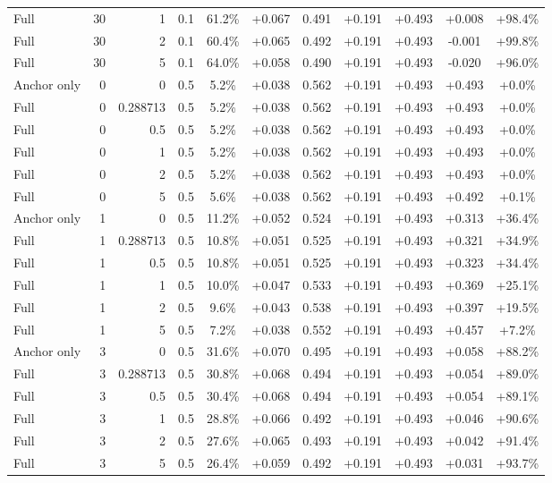 \begin{table}[htbp]
\begin{tabular}{lrrrccccccc}
Full & 30 & 1 & 0.1 & 61.2\% & +0.067 & 0.491 & +0.191 & +0.493 & +0.008 & +98.4\% \\
Full & 30 & 2 & 0.1 & 60.4\% & +0.065 & 0.492 & +0.191 & +0.493 & -0.001 & +99.8\% \\
Full & 30 & 5 & 0.1 & 64.0\% & +0.058 & 0.490 & +0.191 & +0.493 & -0.020 & +96.0\% \\
Anchor only & 0 & 0 & 0.5 & 5.2\% & +0.038 & 0.562 & +0.191 & +0.493 & +0.493 & +0.0\% \\
Full & 0 & 0.288713 & 0.5 & 5.2\% & +0.038 & 0.562 & +0.191 & +0.493 & +0.493 & +0.0\% \\
Full & 0 & 0.5 & 0.5 & 5.2\% & +0.038 & 0.562 & +0.191 & +0.493 & +0.493 & +0.0\% \\
Full & 0 & 1 & 0.5 & 5.2\% & +0.038 & 0.562 & +0.191 & +0.493 & +0.493 & +0.0\% \\
Full & 0 & 2 & 0.5 & 5.2\% & +0.038 & 0.562 & +0.191 & +0.493 & +0.493 & +0.0\% \\
Full & 0 & 5 & 0.5 & 5.6\% & +0.038 & 0.562 & +0.191 & +0.493 & +0.492 & +0.1\% \\
Anchor only & 1 & 0 & 0.5 & 11.2\% & +0.052 & 0.524 & +0.191 & +0.493 & +0.313 & +36.4\% \\
Full & 1 & 0.288713 & 0.5 & 10.8\% & +0.051 & 0.525 & +0.191 & +0.493 & +0.321 & +34.9\% \\
Full & 1 & 0.5 & 0.5 & 10.8\% & +0.051 & 0.525 & +0.191 & +0.493 & +0.323 & +34.4\% \\
Full & 1 & 1 & 0.5 & 10.0\% & +0.047 & 0.533 & +0.191 & +0.493 & +0.369 & +25.1\% \\
Full & 1 & 2 & 0.5 & 9.6\% & +0.043 & 0.538 & +0.191 & +0.493 & +0.397 & +19.5\% \\
Full & 1 & 5 & 0.5 & 7.2\% & +0.038 & 0.552 & +0.191 & +0.493 & +0.457 & +7.2\% \\
Anchor only & 3 & 0 & 0.5 & 31.6\% & +0.070 & 0.495 & +0.191 & +0.493 & +0.058 & +88.2\% \\
Full & 3 & 0.288713 & 0.5 & 30.8\% & +0.068 & 0.494 & +0.191 & +0.493 & +0.054 & +89.0\% \\
Full & 3 & 0.5 & 0.5 & 30.4\% & +0.068 & 0.494 & +0.191 & +0.493 & +0.054 & +89.1\% \\
Full & 3 & 1 & 0.5 & 28.8\% & +0.066 & 0.492 & +0.191 & +0.493 & +0.046 & +90.6\% \\
Full & 3 & 2 & 0.5 & 27.6\% & +0.065 & 0.493 & +0.191 & +0.493 & +0.042 & +91.4\% \\
Full & 3 & 5 & 0.5 & 26.4\% & +0.059 & 0.492 & +0.191 & +0.493 & +0.031 & +93.7\% \\

\end{tabular}
\end{table}
